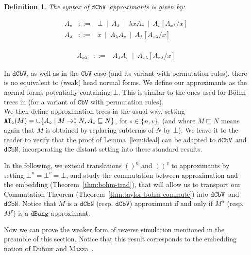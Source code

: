 \documentclass[10pt,a4paper]{article}
\newtheorem{definition}[theorem]{Definition}
\newcommand{\<}{\langle}
\renewcommand{\>}{\rangle}
\newcommand{\alt}{~\mid~}
\newcommand{\dcbn}{\ensuremath{\mathtt{dCbN}}}
\newcommand{\dcbv}{\ensuremath{\mathtt{dCbV}}}
\newcommand{\cbv}{\ensuremath{\mathtt{CbV}}}
\newcommand{\dbang}{\ensuremath{\mathtt{dBang}}}
\newcommand{\es}[2]{[#1/#2]}
\newcommand{\tradv}[1]{\ensuremath{{#1}^v}}
\newcommand{\tradn}[1]{\ensuremath{{#1}^n}}
\newcommand{\bt}{\ensuremath{{\tt{AT}}}}
\begin{document}
\begin{definition} The syntax of \dcbv\ approximants is given by:

\begin{minipage}{0.45\textwidth}
$$\begin{array}{lll}
	A_v & ::= & \bot\alt A_{\lambda } \alt \lambda x A_v \alt A_v\es{A_{x\lambda }}x \\
	A_{\lambda} & ::= &  x  \alt A_{\lambda} A_v \alt A_{\lambda
	}\es{A_{x\lambda }}x \\
\end{array}$$		
\end{minipage}
%
\begin{minipage}{0.54\textwidth}
	$$\begin{array}{lll}
	A_{x\lambda } & ::= & A_{\lambda } A_v   \alt
	 A_{x\lambda }
	\es{A_{x\lambda }}x
\end{array}$$
\end{minipage}

\end{definition}
In \dcbv{}, as well as in the \cbv{} case (and its variant with permutation rules), there is no equivalent to (weak) head normal forms. We define our approximants as the normal forms potentially containing $\bot$. This is similar to the ones used for Böhm trees in \cite{kerinec:bohmTreeCbV} (for a variant of \cbv{} with permutation rules).\\ 

We then define approximation trees in the usual way, setting
$\bt_\circ(M)=\cup\{A_\circ\mid M\to_\circ^*N,A_\circ\sqsubseteq N\}$, for $\circ\in\{n,v\}$,
(and where $M\sqsubseteq N$ means again that $M$ is obtained by replacing subterms of
$N$ by $\bot$). We leave it to the reader to
verify that the proof of Lemma~\ref{lem:ideal} can be adapted to \dcbv\ and
\dcbn, incorporating the distant setting into these standard
results.

In the following, we extend translations $()^n$ and $()^v$ to
approximants by setting $\bot^n=\bot^v=\bot$, and study the
commutation between approximation and the embedding
(Theorem~\ref{thm:bohm-trad}), that will allow us to transport our
Commutation Theorem (Theorem~\ref{thm:taylor-bohm-commute}) into
\dcbv\ and \dcbn. Notice that $M$ is a \dcbn{} (resp. \dcbv{})
approximant if and only if $\tradn M$ (resp. $\tradv M$) is a \dbang{}
approximant.

Now we can prove the weaker form of reverse simulation mentioned in the preamble of
this section. Notice that this result corresponds to the 
embedding notion of Dufour and Mazza~\cite{mazza-dufour}.
\end{document}
